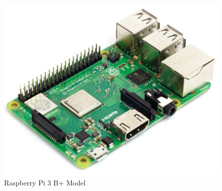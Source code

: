 \medskip
\begin{figure}[H]
\centering
    \includegraphics[scale=1]{./images/pi.jpg}
    \caption{Raspberry Pi 3 B+ Model}
    \label{pi}
\end{figure}




